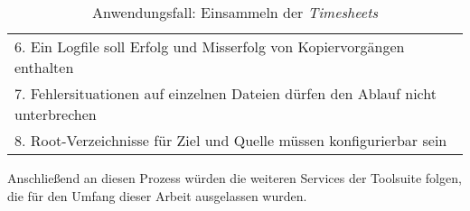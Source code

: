 \begin{table}[H]
\begin{tabular}[H]{|l|l|}
        \multicolumn{2}{|l|}{6. Ein Logfile soll Erfolg und Misserfolg von Kopiervorgängen enthalten} \\
        \multicolumn{2}{|l|}{7. Fehlersituationen auf einzelnen Dateien dürfen den Ablauf nicht unterbrechen} \\
        \multicolumn{2}{|l|}{8. Root-Verzeichnisse für Ziel und Quelle müssen konfigurierbar sein} \\
        \hline
    \end{tabular}
    \caption{Anwendungsfall: Einsammeln der \textit{\glspl{Timesheet}}}
    \label{tab:use-case-analyse-timesheets}
\end{table}

Anschließend an diesen Prozess würden die weiteren Services der Toolsuite folgen, die für den Umfang dieser Arbeit ausgelassen wurden.